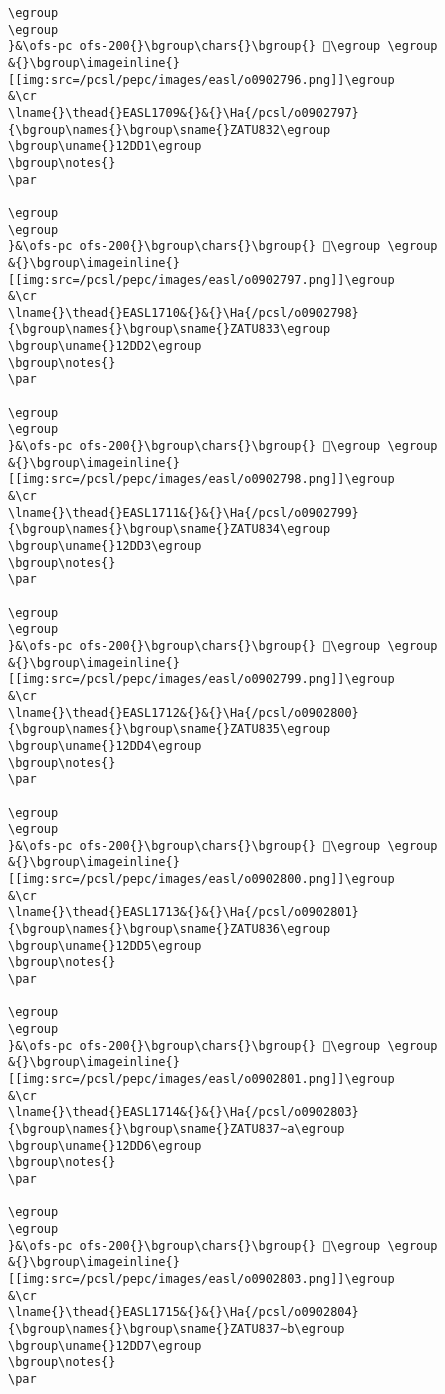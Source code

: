 \begin{verbatim}
\egroup
\egroup
}&\ofs-pc ofs-200{}\bgroup\chars{}\bgroup{} 𒷐\egroup \egroup
&{}\bgroup\imageinline{}[[img:src=/pcsl/pepc/images/easl/o0902796.png]]\egroup
&\cr
\lname{}\thead{}EASL1709&{}&{}\Ha{/pcsl/o0902797}{\bgroup\names{}\bgroup\sname{}ZATU832\egroup
\bgroup\uname{}12DD1\egroup
\bgroup\notes{}
\par 

\egroup
\egroup
}&\ofs-pc ofs-200{}\bgroup\chars{}\bgroup{} 𒷑\egroup \egroup
&{}\bgroup\imageinline{}[[img:src=/pcsl/pepc/images/easl/o0902797.png]]\egroup
&\cr
\lname{}\thead{}EASL1710&{}&{}\Ha{/pcsl/o0902798}{\bgroup\names{}\bgroup\sname{}ZATU833\egroup
\bgroup\uname{}12DD2\egroup
\bgroup\notes{}
\par 

\egroup
\egroup
}&\ofs-pc ofs-200{}\bgroup\chars{}\bgroup{} 𒷒\egroup \egroup
&{}\bgroup\imageinline{}[[img:src=/pcsl/pepc/images/easl/o0902798.png]]\egroup
&\cr
\lname{}\thead{}EASL1711&{}&{}\Ha{/pcsl/o0902799}{\bgroup\names{}\bgroup\sname{}ZATU834\egroup
\bgroup\uname{}12DD3\egroup
\bgroup\notes{}
\par 

\egroup
\egroup
}&\ofs-pc ofs-200{}\bgroup\chars{}\bgroup{} 𒷓\egroup \egroup
&{}\bgroup\imageinline{}[[img:src=/pcsl/pepc/images/easl/o0902799.png]]\egroup
&\cr
\lname{}\thead{}EASL1712&{}&{}\Ha{/pcsl/o0902800}{\bgroup\names{}\bgroup\sname{}ZATU835\egroup
\bgroup\uname{}12DD4\egroup
\bgroup\notes{}
\par 

\egroup
\egroup
}&\ofs-pc ofs-200{}\bgroup\chars{}\bgroup{} 𒷔\egroup \egroup
&{}\bgroup\imageinline{}[[img:src=/pcsl/pepc/images/easl/o0902800.png]]\egroup
&\cr
\lname{}\thead{}EASL1713&{}&{}\Ha{/pcsl/o0902801}{\bgroup\names{}\bgroup\sname{}ZATU836\egroup
\bgroup\uname{}12DD5\egroup
\bgroup\notes{}
\par 

\egroup
\egroup
}&\ofs-pc ofs-200{}\bgroup\chars{}\bgroup{} 𒷕\egroup \egroup
&{}\bgroup\imageinline{}[[img:src=/pcsl/pepc/images/easl/o0902801.png]]\egroup
&\cr
\lname{}\thead{}EASL1714&{}&{}\Ha{/pcsl/o0902803}{\bgroup\names{}\bgroup\sname{}ZATU837∼a\egroup
\bgroup\uname{}12DD6\egroup
\bgroup\notes{}
\par 

\egroup
\egroup
}&\ofs-pc ofs-200{}\bgroup\chars{}\bgroup{} 𒷖\egroup \egroup
&{}\bgroup\imageinline{}[[img:src=/pcsl/pepc/images/easl/o0902803.png]]\egroup
&\cr
\lname{}\thead{}EASL1715&{}&{}\Ha{/pcsl/o0902804}{\bgroup\names{}\bgroup\sname{}ZATU837∼b\egroup
\bgroup\uname{}12DD7\egroup
\bgroup\notes{}
\par 


\end{verbatim}
